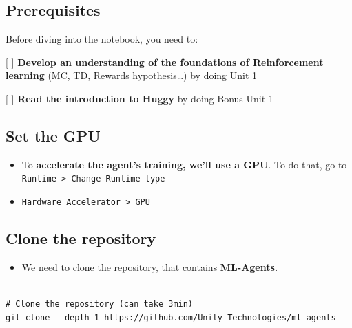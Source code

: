 \documentclass[11pt,a4paper]{article}
\begin{document}
\subsection{Prerequisites}\label{prerequisites}

Before diving into the notebook, you need to:

{[} {]} \textbf{Develop an understanding of the foundations of Reinforcement learning} (MC, TD, Rewards hypothesis\ldots) by doing Unit 1

{[} {]} \textbf{Read the introduction to Huggy} by doing Bonus Unit 1

\subsection{Set the GPU}\label{set-the-gpu}

\begin{itemize}
\tightlist
\item
  To \textbf{accelerate the agent's training, we'll use a GPU}. To do that, go to \texttt{Runtime\ \textgreater{}\ Change\ Runtime\ type}
\end{itemize}


\begin{itemize}
\tightlist
\item
  \texttt{Hardware\ Accelerator\ \textgreater{}\ GPU}
\end{itemize}


\subsection{Clone the repository}\label{clone-the-repository}

\begin{itemize}
\tightlist
\item
  We need to clone the repository, that contains \textbf{ML-Agents.}
\end{itemize}

\begin{lstlisting}

# Clone the repository (can take 3min)
git clone --depth 1 https://github.com/Unity-Technologies/ml-agents
\end{lstlisting}
\end{document}
